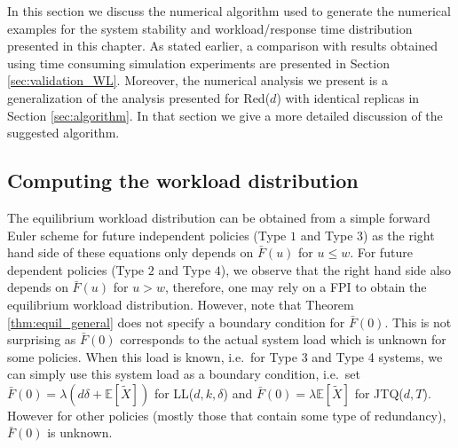 \documentclass[12pt]{report}
\newcommand{\E}{\mathbb{E}}
\begin{document}
In this section we discuss the numerical algorithm used to generate the numerical examples
for the system stability and workload/response time distribution presented in this chapter. 
As stated earlier, a comparison
with results obtained using time consuming simulation experiments are presented in Section \ref{sec:validation_WL}. Moreover, the numerical analysis we present is a generalization of the analysis presented for Red($d$) with identical replicas in Section \ref{sec:algorithm}. In that section we give a more detailed discussion of the suggested algorithm.

\subsection{Computing the workload distribution}
The equilibrium workload distribution can be obtained from a simple forward Euler scheme for future independent policies (Type $1$ and Type $3$) as the right hand side of these equations only depends on $\bar F(u)$ for $u \leq w$. For future dependent policies (Type $2$ and Type $4$), we observe that the right hand side also depends on $\bar F(u)$ for $u > w$, therefore, one may rely on a FPI to obtain the equilibrium workload distribution. However, note that Theorem \ref{thm:equil_general} does not specify a boundary condition for $\bar F(0)$.
This is not surprising as $\bar F(0)$ corresponds to the actual system load which is unknown for some policies. When this load is known, i.e.~for Type 3 and Type 4 systems, we can simply use this system load as a boundary condition, i.e.~set $\bar F(0) = \lambda (d\delta + \E[\tilde X])$ for LL($d,k,\delta$) and $\bar F(0) = \lambda \E[\tilde X]$ for JTQ($d,T$). However for other policies (mostly those that contain some type of redundancy), $\bar F(0)$ is unknown. 
\end{document}
